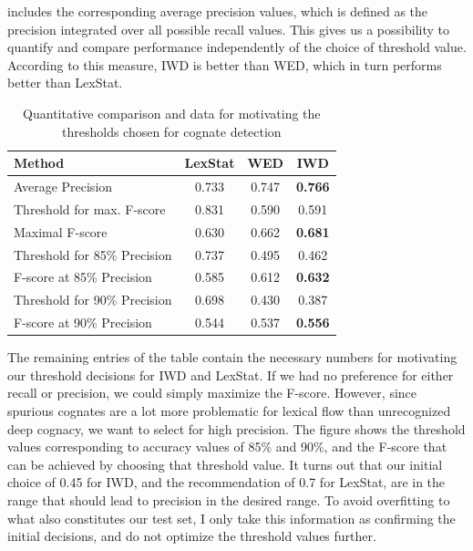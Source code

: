  includes the corresponding average precision values, which is defined as the precision integrated over all possible recall values. This gives us a possibility to quantify and compare performance independently of the choice of threshold value. According to this measure, IWD is better than WED, which in turn performs better than LexStat.

\begin{table}
\centering
\begin{tabular}{lccc}
\hline \hline
Method & LexStat & WED & IWD\\
\hline
Average Precision & 0.733 & 0.747 & \textbf{0.766}\\
\hline
Threshold for max. F-score & 0.831 & 0.590 & 0.591\\
Maximal F-score & 0.630 & 0.662 & \textbf{0.681}\\
\hline
Threshold for 85\% Precision & 0.737 & 0.495 & 0.462\\
F-score at 85\% Precision & 0.585 & 0.612 & \textbf{0.632}\\
\hline
Threshold for 90\% Precision & 0.698 & 0.430 & 0.387\\
F-score at 90\% Precision & 0.544 & 0.537 & \textbf{0.556}\\
\hline
\end{tabular}
\caption{Quantitative comparison and data for motivating the thresholds chosen for cognate detection}
\label{average-precision-thresholds}
\end{table}

The remaining entries of the table contain the necessary numbers for motivating our threshold decisions for IWD and LexStat. If we had no preference for either recall or precision, we could simply maximize the F-score. However, since spurious cognates are a lot more problematic for lexical flow than unrecognized deep cognacy, we want to select for high precision. The figure shows the threshold values corresponding to accuracy values of 85\% and 90\%, and the F-score that can be achieved by choosing that threshold value. It turns out that our initial choice of 0.45 for IWD, and the recommendation of 0.7 for LexStat, are in the range that should lead to precision in the desired range. To avoid overfitting to what also constitutes our test set, I only take this information as confirming the initial decisions, and do not optimize the threshold values further.

